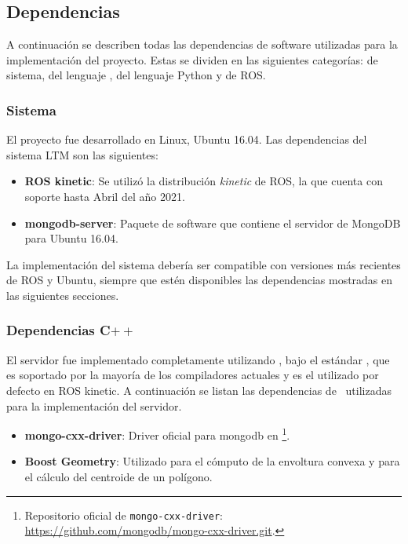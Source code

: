 \subsection{Dependencias}

A continuación se describen todas las dependencias de software utilizadas para la implementación del proyecto. Estas se dividen en las siguientes categorías: de sistema, del lenguaje \CC, del lenguaje Python y de ROS.


\subsubsection{Sistema}

El proyecto fue desarrollado en Linux, Ubuntu 16.04. Las dependencias del sistema LTM son las siguientes:

\begin{itemize}
\item {\bfseries ROS kinetic}: Se utilizó la distribución \textit{kinetic} de ROS, la que cuenta con soporte hasta Abril del año 2021.
\item {\bfseries mongodb-server}: Paquete de software que contiene el servidor de MongoDB para Ubuntu 16.04.
\end{itemize}

La implementación del sistema debería ser compatible con versiones más recientes de ROS y Ubuntu, siempre que estén disponibles las dependencias mostradas en las siguientes secciones.


\subsubsection{Dependencias C$++$}

El servidor fue implementado completamente utilizando \CC, bajo el estándar , que es soportado por la mayoría de los compiladores actuales y es el utilizado por defecto en ROS kinetic. A continuación se listan las dependencias de \CC \ utilizadas para la implementación del servidor.

\begin{itemize}
	\item {\bfseries mongo-cxx-driver}: Driver oficial para mongodb en \CC\footnote{Repositorio oficial de \texttt{mongo-cxx-driver}: \url{https://github.com/mongodb/mongo-cxx-driver.git}.}. 
	\item {\bfseries Boost Geometry}: Utilizado para el cómputo de la envoltura convexa y para el cálculo del centroide de un polígono.
\end{itemize}


